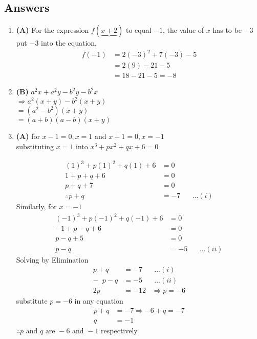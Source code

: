 \subsection{Answers}
\begin{multicols}{2}
\begin{enumerate}[label={\textbf{\arabic*.}}]
\item \textbf{(A)} For the expression $f(\underbrace{x + 2})$ to equal $-1$, the value of  $x$ has to be $-3$ \\ 
put $-3$ into the equation,   
    \begin{align*}
     f(-1) &= 2(-3)^2 + 7(-3) - 5 \\
     &= 2(9) - 21 - 5 \\
     &= 18 - 21 - 5 = -8
    \end{align*}
\item \textbf{(B)} $a^2x + a^2y - b^2y - b^2x $ \\
        $\Rightarrow a^2(x + y) -b^2(x + y) $ \\
        $= (a^2 - b^2)(x + y) $ \\
        $=(a + b)(a - b) (x + y)$
\item \textbf{(A)} for $x-1 = 0, x = 1 $ and $ x+1=0, x = -1$ \\
    substituting $x = 1$ into $x^3 + px^2 + qx + 6 = 0$ 

    \begin{align*}
    (1)^3 + p(1)^2 + q(1) + 6 &= 0 \\
    1+ p + q + 6 &= 0 \\
    p + q + 7 &= 0 \\
    \therefore p + q &= -7 \hspace{20pt} ...(i)
    \end{align*}
    Similarly, for $x = -1$
    \begin{align*}
        (-1)^3 + p(-1)^2 + q(-1) + 6 &= 0 \\
        -1+ p - q + 6 &= 0 \\
        p - q + 5 &= 0 \\
       p - q &= -5 \hspace{20pt} ...(ii)
        \end{align*}
    Solving by Elimination
    \begin{align*}
        p + q &= -7 \hspace{20pt} ...(i)\\
       -\hspace{6pt} p - q &= -5  \hspace{20pt} ...(ii)\\
        2p &= -12 \hspace{10pt} \Rightarrow  p = -6
    \end{align*}
    substitute $p = -6$ in any equation 
    \begin{align*} 
        p + q &= -7
        \Rightarrow -6 + q = -7 \\
        q &=  -1
    \end{align*}
    $\therefore p \text{ and } q \text{ are } -6 \text{ and } -1$ respectively
    


\end{enumerate}
\end{multicols}
